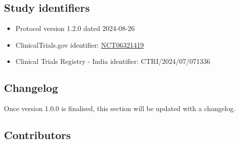 \documentclass[
]{scrartcl}
\begin{document}
\hypertarget{study-identifiers}{%
\subsection{Study identifiers}\label{study-identifiers}}

\begin{itemize}
\item
  Protocol version 1.2.0 dated 2024-08-26
\item
  ClinicalTrials.gov identifier:
  \href{https://clinicaltrials.gov/ct2/show/NCT06321419}{NCT06321419}
\item
  Clinical Trials Registry - India identifier: CTRI/2024/07/071336
\end{itemize}

\hypertarget{changelog}{%
\subsection{Changelog}\label{changelog}}

Once version 1.0.0 is finalised, this section will be updated with a
changelog.

\hypertarget{contributors}{%
\subsection{Contributors}\label{contributors}}
\end{document}
